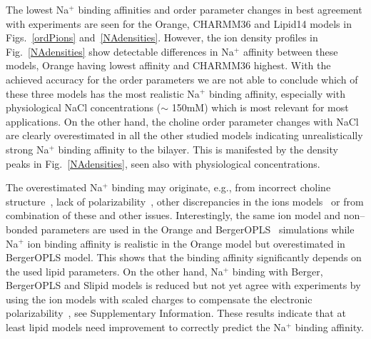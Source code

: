 \documentclass[pre,aps,floatfix,authordate1-4,twocolumn]{revtex4-1}
\begin{document}
The lowest Na$^+$ binding affinities and order parameter changes in best agreement with experiments are seen for the Orange,
CHARMM36 and Lipid14 models in Figs.~\ref{ordPions} and~\ref{NAdensities}. However, the ion density profiles in Fig.~\ref{NAdensities} show 
detectable differences in Na$^+$ affinity between these models, Orange having lowest affinity and CHARMM36 highest. 
With the achieved accuracy for the order parameters we are not able to conclude which of these three models has the most realistic 
Na$^+$ binding affinity, especially with physiological NaCl concentrations ($\sim$ 150mM) which is most relevant for most applications. 
On the other hand, the choline order parameter changes with NaCl are clearly overestimated in
all the other studied models indicating unrealistically strong Na$^+$ binding affinity to the bilayer.
This is manifested by the density peaks in Fig.~\ref{NAdensities}, seen also with physiological concentrations. 

The overestimated Na$^+$ binding may originate, e.g., from incorrect choline structure~\cite{botan15}, 
lack of polarizability~\cite{leontyev11}, other discrepancies in the ions models~\cite{Reif13,??} or from
combination of these and other issues. Interestingly, the same ion model and non--bonded parameters
are used in the Orange and BergerOPLS~\cite{tieleman06} simulations while Na$^+$ ion binding affinity
is realistic in the Orange model but overestimated in BergerOPLS model. This shows that the binding 
affinity significantly depends on the used lipid parameters. On the other hand, 
Na$^+$ binding with Berger, BergerOPLS and Slipid models is reduced but not yet agree with experiments 
by using the ion models with scaled charges to compensate the electronic polarizability~\cite{kohagen15,leontyev11}, 
see Supplementary Information. These results indicate that at least lipid models need improvement to 
correctly predict the Na$^+$ binding affinity.

\end{document}
